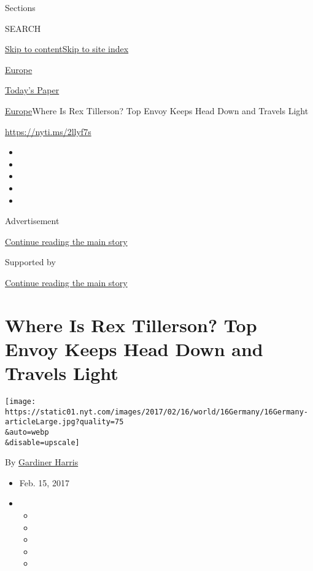 Sections

SEARCH

\protect\hyperlink{site-content}{Skip to
content}\protect\hyperlink{site-index}{Skip to site index}

\href{https://www.nytimes.com/section/world/europe}{Europe}

\href{https://myaccount.nytimes.com/auth/login?response_type=cookie\&client_id=vi}{}

\href{https://www.nytimes.com/section/todayspaper}{Today's Paper}

\href{/section/world/europe}{Europe}\textbar{}Where Is Rex Tillerson?
Top Envoy Keeps Head Down and Travels Light

\url{https://nyti.ms/2llyf7s}

\begin{itemize}
\item
\item
\item
\item
\item
\end{itemize}

Advertisement

\protect\hyperlink{after-top}{Continue reading the main story}

Supported by

\protect\hyperlink{after-sponsor}{Continue reading the main story}

\hypertarget{where-is-rex-tillerson-top-envoy-keeps-head-down-and-travels-light}{%
\section{Where Is Rex Tillerson? Top Envoy Keeps Head Down and Travels
Light}\label{where-is-rex-tillerson-top-envoy-keeps-head-down-and-travels-light}}

\texttt{[image: https://static01.nyt.com/images/2017/02/16/world/16Germany/16Germany-articleLarge.jpg?quality=75\\\&auto=webp\\\&disable=upscale]}

By \href{http://www.nytimes.com/by/gardiner-harris}{Gardiner Harris}

\begin{itemize}
\item
  Feb. 15, 2017
\item
  \begin{itemize}
  \item
  \item
  \item
  \item
  \item
  \end{itemize}
\end{itemize}

